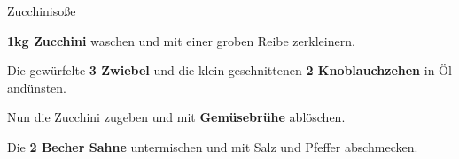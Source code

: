 \begin{recipe}[]{Zucchinisoße} %


\step
\textbf{1kg Zucchini} waschen und mit einer groben Reibe zerkleinern.

\step
Die gewürfelte \textbf{3 Zwiebel} und die klein geschnittenen \textbf{2 Knoblauchzehen} in Öl andünsten.

\step
Nun die Zucchini zugeben und mit \textbf{Gemüsebrühe} ablöschen.

\step
Die \textbf{2 Becher Sahne} untermischen und mit Salz und Pfeffer abschmecken.

\end{recipe}